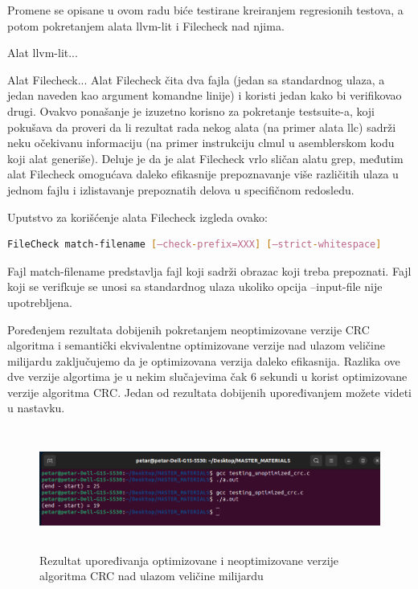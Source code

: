 \documentclass[12pt,oneside]{memoir}
\begin{document}
Promene se opisane u ovom radu biće testirane kreiranjem regresionih testova, a potom pokretanjem alata llvm-lit i Filecheck nad njima.

Alat llvm-lit...

Alat Filecheck...
Alat Filecheck čita dva fajla (jedan sa standardnog ulaza, a jedan naveden kao argument komandne linije) i koristi jedan kako bi verifikovao drugi. Ovakvo ponašanje je izuzetno korisno za pokretanje testsuite-a, koji pokušava da proveri da li rezultat rada nekog alata (na primer alata llc) sadrži neku očekivanu informaciju (na primer instrukciju clmul u asemblerskom kodu koji alat generiše). Deluje je da je alat Filecheck vrlo sličan alatu grep, međutim alat Filecheck omogućava daleko efikasnije prepoznavanje više različitih ulaza u jednom fajlu i izlistavanje prepoznatih delova u specifičnom redosledu. 

Uputstvo za korišćenje alata Filecheck izgleda ovako:
\begin{lstlisting}[language=bash]
FileCheck match-filename [–check-prefix=XXX] [–strict-whitespace]
\end{lstlisting}

Fajl match-filename predstavlja fajl koji sadrži obrazac koji treba prepoznati. Fajl koji se verifkuje se unosi sa standardnog ulaza ukoliko opcija --input-file nije upotrebljena.


Poređenjem rezultata dobijenih pokretanjem neoptimizovane verzije CRC algoritma i semantički 
ekvivalentne optimizovane verzije nad ulazom veličine milijardu zaključujemo da je optimizovana 
verzija daleko efikasnija. Razlika ove dve verzije algortima je u nekim slučajevima čak 6 sekundi 
u korist optimizovane verzije algoritma CRC. Jedan od rezultata dobijenih upoređivanjem možete 
videti u nastavku.

\begin{figure}
\includegraphics[width=\textwidth, height=4cm]{comparing_crcs}
\caption{Rezultat upoređivanja optimizovane i neoptimizovane verzije algoritma CRC nad ulazom veličine milijardu}
\end{figure}
\end{document}
